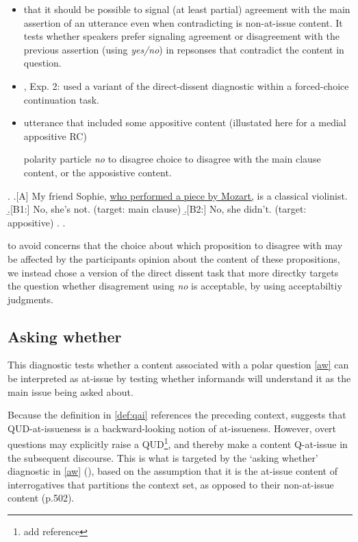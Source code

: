 \documentclass[times,linguex,xcolor]{glossa}
\begin{document}
    \begin{itemize}
      \item that it should be possible to signal (at least partial) agreement with the main assertion of an utterance even when contradicting is non-at-issue content. It tests whether speakers prefer signaling agreement or disagreement with the previous assertion (using \emph{yes/no}) in repsonses that contradict the content in question.

    \end{itemize}

    \begin{itemize}
      \item \citealt{syrett_experimental_2015}, Exp. 2: used a variant of the direct-dissent diagnostic within a forced-choice continuation task. 
      \item utterance that included some appositive content (illustated here for a medial appositive RC)

      polarity particle \emph{no} to disagree  choice to disagree with the main clause content, or the apposistive content.
    \end{itemize}

    \ex. \a.[A] My friend Sophie, \underline{who performed a piece by Mozart,} is a classical violinist.
      \b.[B1:] No, she’s not. (target: main clause)
      \b.[B2:] No, she didn’t. (target: appositive)
      \z. \z. 

      to avoid concerns that the choice about which proposition to disagree with may be affected by the participants opinion about the content of these propositions, we instead chose a version of the direct dissent task that more directky targets the question whether disagrement using \emph{no} is acceptable, by using acceptabiltiy judgments.

  \subsection{Asking whether}
    This diagnostic tests whether a content associated with a polar question \ref{aw} can be interpreted as at-issue by testing whether informands will understand it as the main issue being asked about.

    Because the definition in \ref{def:qai} references the preceding context, \citet{koev_notions_2018} suggests that QUD-at-issueness is a backward-looking notion of at-issueness. However, overt questions may explicitly raise a QUD\footnote{add reference}, and thereby make a content Q-at-issue in the subsequent discourse. This is what is targeted by the `asking whether' diagnostic in \ref{aw} (\citealt{tonhauser_how_2018}), based on the assumption that it is the at-issue content of interrogatives that partitions the context set, as opposed to their non-at-issue content (p.502).
\end{document}
